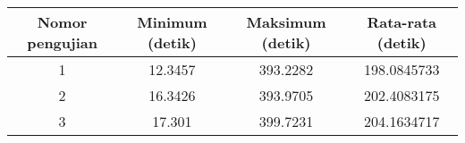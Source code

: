 \begin{tabular}{| c | c | c | c |}
    \hline
    Nomor pengujian & Minimum (detik) & Maksimum (detik) & Rata-rata (detik) \\
    \hline
    \hline
    1 & 12.3457 & 393.2282 & 198.0845733 \\
    \hline
    2 & 16.3426 & 393.9705 & 202.4083175 \\
    \hline
    3 & 17.301 & 399.7231 & 204.1634717 \\
    \hline
\end{tabular}